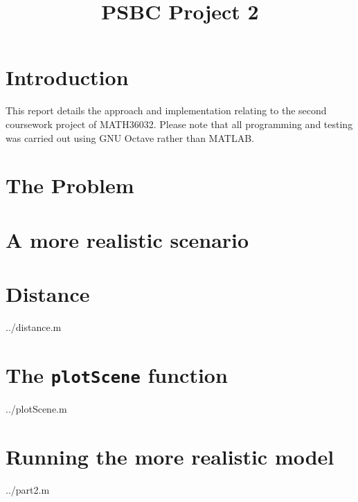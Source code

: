 \documentclass[10pt]{article}
\title{PSBC Project 2}
\newcommand{\inlinemaketitle}{{\let\newpage\relax\maketitle}}
\begin{document}
\inlinemaketitle
\section{Introduction}

This report details the approach and implementation relating to the second coursework project of MATH36032. Please note that all programming and testing was carried out using GNU Octave rather than MATLAB.

\section{The Problem}



\section{A more realistic scenario}


\begin{appendices}

\section{Distance}\label{ap:distance}
  {../distance.m}


\section{The \texttt{plotScene} function}\label{ap:plotScene}
  {../plotScene.m}

\section{Running the more realistic model}\label{ap:part2}
  {../part2.m}
\end{appendices}


\begin{thebibliography}{9}
\end{thebibliography}
\end{document}

